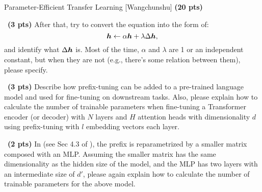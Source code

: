 \begin{question}{
Parameter-Efficient Transfer Learning [Wangchunshu] \textbf{(20 pts)}}
\begin{subquestion}{~\small \textbf{(3 pts)}}
After that, try to convert the equation into the form of:
\begin{equation}
\label{eq:lora}
    {\bm{h}} \leftarrow \alpha {\bm{h}} + \lambda \Delta{\bm{h}},
\end{equation}
and identify what $\Delta{\bm{h}}$ is. Most of the time, $\alpha$ and $\lambda$ are 1 or an independent constant, but when they are not (e.g., there's some relation between them), please specify.

\end{subquestion}




\begin{subquestion}{~\small \textbf{(3 pts)}}
Describe how prefix-tuning can be added to a pre-trained language model and used for fine-tuning on downstream tasks. Also, please explain how to calculate the number of trainable parameters when fine-tuning a Transformer encoder (or decoder) with $N$ layers and $H$ attention heads with dimensionality $d$ using prefix-tuning with $l$ embedding vectors each layer. 

\end{subquestion}



\begin{subquestion}{~\small \textbf{(2 pts)}}
In \cite{li-liang-2021-prefix} (see Sec 4.3 of \cite{li-liang-2021-prefix}), the prefix is reparametrized by a smaller matrix composed with an MLP. Assuming the smaller matrix has the same dimensionality as the hidden size of the model, and the MLP has two layers with an intermediate size of $d'$, please again explain how to calculate the number of trainable parameters for the above model.

\end{subquestion}


\end{question}
